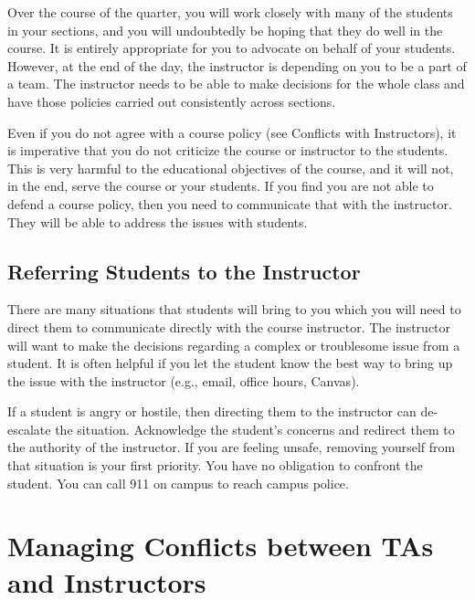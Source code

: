 \documentclass[
  letterpaper,
  DIV=11,
  numbers=noendperiod]{scrreprt}
\begin{document}
Over the course of the quarter, you will work closely with many of the
students in your sections, and you will undoubtedly be hoping that they
do well in the course. It is entirely appropriate for you to advocate on
behalf of your students. However, at the end of the day, the instructor
is depending on you to be a part of a team. The instructor needs to be
able to make decisions for the whole class and have those policies
carried out consistently across sections.

Even if you do not agree with a course policy (see Conflicts with
Instructors), it is imperative that you do not criticize the course or
instructor to the students. This is very harmful to the educational
objectives of the course, and it will not, in the end, serve the course
or your students. If you find you are not able to defend a course
policy, then you need to communicate that with the instructor. They will
be able to address the issues with students.

\hypertarget{referring-students-to-the-instructor}{%
\section{Referring Students to the
Instructor}\label{referring-students-to-the-instructor}}

There are many situations that students will bring to you which you will
need to direct them to communicate directly with the course instructor.
The instructor will want to make the decisions regarding a complex or
troublesome issue from a student. It is often helpful if you let the
student know the best way to bring up the issue with the instructor
(e.g., email, office hours, Canvas).

If a student is angry or hostile, then directing them to the instructor
can de-escalate the situation. Acknowledge the student's concerns and
redirect them to the authority of the instructor. If you are feeling
unsafe, removing yourself from that situation is your first priority.
You have no obligation to confront the student. You can call 911 on
campus to reach campus police.

\hypertarget{managing-conflicts-between-tas-and-instructors}{%
\chapter{Managing Conflicts between TAs and
Instructors}\label{managing-conflicts-between-tas-and-instructors}}
\end{document}
